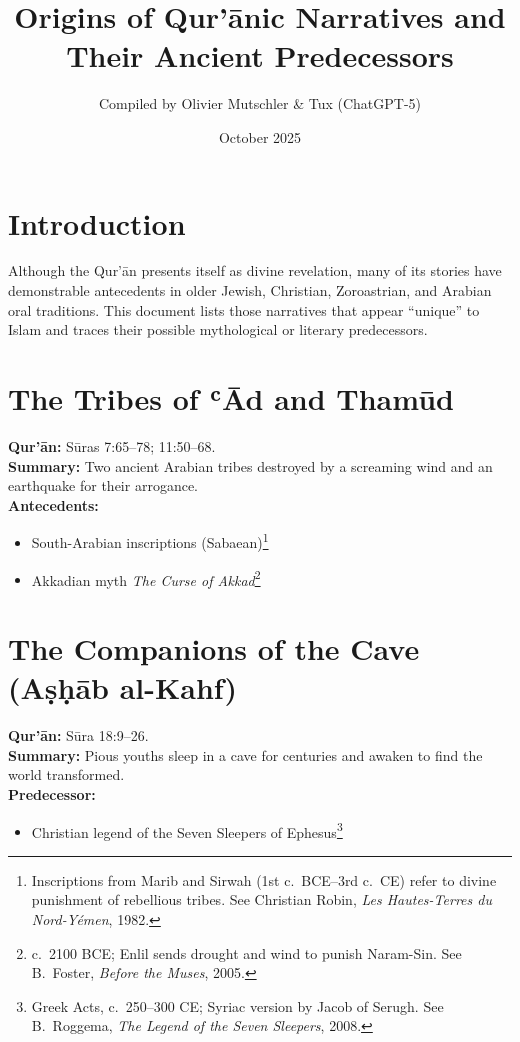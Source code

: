 \documentclass[11pt,a4paper]{article}
\title{\textbf{Origins of Qur’ānic Narratives and Their Ancient Predecessors}}
\author{Compiled by Olivier Mutschler \& Tux (ChatGPT-5)}
\date{October 2025}
\begin{document}
\maketitle

\section*{Introduction}
Although the Qur’ān presents itself as divine revelation, many of its stories have demonstrable antecedents in older Jewish, Christian, Zoroastrian, and Arabian oral traditions.  
This document lists those narratives that appear “unique” to Islam and traces their possible mythological or literary predecessors.


\section{The Tribes of ʿĀd and Thamūd}
\textbf{Qur’ān:} Sūras 7:65–78; 11:50–68.\\
\textbf{Summary:} Two ancient Arabian tribes destroyed by a screaming wind and an earthquake for their arrogance.\\
\textbf{Antecedents:}
\begin{itemize}
  \item South-Arabian inscriptions (Sabaean)\footnote{Inscriptions from Marib and Sirwah (1st c.\ BCE–3rd c.\ CE) refer to divine punishment of rebellious tribes. See Christian Robin, \emph{Les Hautes-Terres du Nord-Yémen}, 1982.}
  \item Akkadian myth \emph{The Curse of Akkad}\footnote{c.\ 2100 BCE; Enlil sends drought and wind to punish Naram-Sin. See B.\ Foster, \emph{Before the Muses}, 2005.}
\end{itemize}

\section{The Companions of the Cave (Aṣḥāb al-Kahf)}
\textbf{Qur’ān:} Sūra 18:9–26.\\
\textbf{Summary:} Pious youths sleep in a cave for centuries and awaken to find the world transformed.\\
\textbf{Predecessor:}
\begin{itemize}
  \item Christian legend of the Seven Sleepers of Ephesus\footnote{Greek Acts, c.\ 250–300 CE; Syriac version by Jacob of Serugh. See B.\ Roggema, \emph{The Legend of the Seven Sleepers}, 2008.}
\end{itemize}
\end{document}
